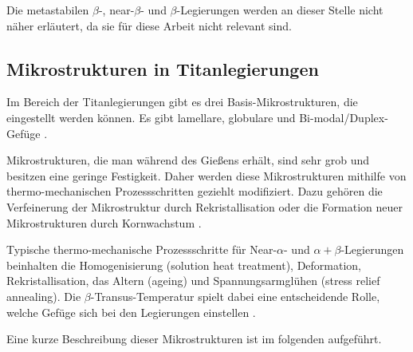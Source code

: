Die metastabilen $\beta$-, near-$\beta$- und $\beta$-Legierungen werden an dieser Stelle nicht näher erläutert, da sie für diese Arbeit nicht relevant sind.

\subsection{Mikrostrukturen in Titanlegierungen}
Im Bereich der Titanlegierungen gibt es drei Basis-Mikrostrukturen, die eingestellt werden können. Es gibt lamellare, globulare und Bi-modal/Duplex-Gefüge \cite{C.Leyens.2005,Lutjering.2007,Boyer.2007,M.J.Donachie.2010}.

Mikrostrukturen, die man während des Gießens erhält, sind sehr grob und besitzen eine geringe Festigkeit. Daher werden diese Mikrostrukturen mithilfe von thermo-mechanischen Prozessschritten geziehlt modifiziert. Dazu gehören die Verfeinerung der Mikrostruktur durch Rekristallisation oder die Formation neuer Mikrostrukturen durch Kornwachstum \cite{C.Leyens.2005,Lutjering.2007,Boyer.2007,M.J.Donachie.2010}.

Typische thermo-mechanische Prozessschritte für Near-$\alpha$- und $\alpha+\beta$-Legierungen beinhalten die Homogenisierung (solution heat treatment), Deformation, Rekristallisation, das Altern (ageing) und Spannungsarmglühen (stress relief annealing). Die $\beta$-Transus-Temperatur spielt dabei eine entscheidende Rolle, welche Gefüge sich bei den Legierungen einstellen \cite{C.Leyens.2005,Lutjering.2007,Boyer.2007}.
 
Eine kurze Beschreibung dieser Mikrostrukturen ist im folgenden aufgeführt.

